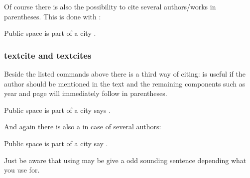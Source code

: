 \documentclass[a4paper,
10pt,
greek,
french,
spanish,
italian,
ngerman,
english,
]{ltxdoc}
\begin{document}
\DescribeMacro{\parencites}
Of course there is also the possibility to cite several authors/works in parentheses.
This is done with :
\begin{example}
Public space is part of a city \parencites(cf.)(){Osland2016}{Evangelidis2014}.
\end{example}

\subsubsection{textcite and textcites}
\DescribeMacro{\textcite}
Beside the listed  commands above there is a third way of citing:
 is useful if the author should be mentioned in the text and
the remaining components such as year and page will immediately follow in parentheses. 

\begin{example}
Public space is part of a city says \textcite{Osland2016}.
\end{example}

\DescribeMacro{\textcites}
And again there is also a  in case of several authors: 
\begin{example}
Public space is part of a city say \textcites{Osland2016}[cf.][]{Evangelidis2014}.
\end{example}
Just be aware that using  may be give a odd sounding sentence depending what you use  for.
\end{document}
